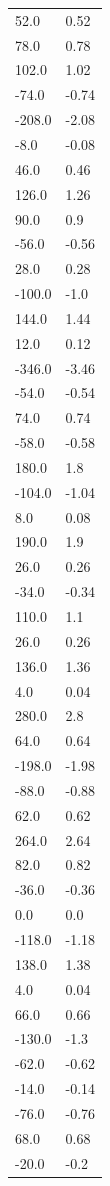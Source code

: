 \begin{longtable}{ll}
52.0 & 0.52 \\
78.0 & 0.78 \\
102.0 & 1.02 \\
-74.0 & -0.74 \\
-208.0 & -2.08 \\
-8.0 & -0.08 \\
46.0 & 0.46 \\
126.0 & 1.26 \\
90.0 & 0.9 \\
-56.0 & -0.56 \\
28.0 & 0.28 \\
-100.0 & -1.0 \\
144.0 & 1.44 \\
12.0 & 0.12 \\
-346.0 & -3.46 \\
-54.0 & -0.54 \\
74.0 & 0.74 \\
-58.0 & -0.58 \\
180.0 & 1.8 \\
-104.0 & -1.04 \\
8.0 & 0.08 \\
190.0 & 1.9 \\
26.0 & 0.26 \\
-34.0 & -0.34 \\
110.0 & 1.1 \\
26.0 & 0.26 \\
136.0 & 1.36 \\
4.0 & 0.04 \\
280.0 & 2.8 \\
64.0 & 0.64 \\
-198.0 & -1.98 \\
-88.0 & -0.88 \\
62.0 & 0.62 \\
264.0 & 2.64 \\
82.0 & 0.82 \\
-36.0 & -0.36 \\
0.0 & 0.0 \\
-118.0 & -1.18 \\
138.0 & 1.38 \\
4.0 & 0.04 \\
66.0 & 0.66 \\
-130.0 & -1.3 \\
-62.0 & -0.62 \\
-14.0 & -0.14 \\
-76.0 & -0.76 \\
68.0 & 0.68 \\
-20.0 & -0.2 \\

\end{longtable}
